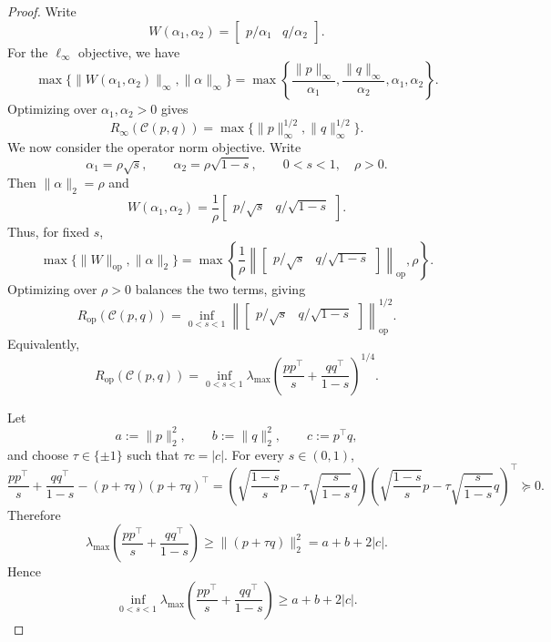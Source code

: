 \documentclass{article}
\begin{document}
\begin{proof}
Write
\[
W(\alpha_1,\alpha_2)
=
\begin{bmatrix}
p/\alpha_1 & q/\alpha_2
\end{bmatrix}.
\]
For the $\ell_\infty$ objective, we have
\[
\max\{\|W(\alpha_1,\alpha_2)\|_\infty,\|\alpha\|_\infty\}
=
\max\left\{
\frac{\|p\|_\infty}{\alpha_1},
\frac{\|q\|_\infty}{\alpha_2},
\alpha_1,
\alpha_2
\right\}.
\]
Optimizing over $\alpha_1,\alpha_2>0$ gives
\[
R_{\infty}(\mathcal{C}(p,q))
=
\max\{\|p\|_\infty^{1/2},\|q\|_\infty^{1/2}\}.
\]
We now consider the operator norm objective. Write
\[
\alpha_1=\rho\sqrt{s},
\qquad
\alpha_2=\rho\sqrt{1-s},
\qquad
0<s<1,\quad \rho>0.
\]
Then $\|\alpha\|_2=\rho$ and
\[
W(\alpha_1,\alpha_2)
=
\frac1{\rho}
\begin{bmatrix}
p/\sqrt{s} & q/\sqrt{1-s}
\end{bmatrix}.
\]
Thus, for fixed $s$,
\[
\max\{\|W\|_{\mathrm{op}},\|\alpha\|_2\}
=
\max\left\{
\frac1{\rho}
\left\|
\begin{bmatrix}
p/\sqrt{s} & q/\sqrt{1-s}
\end{bmatrix}
\right\|_{\mathrm{op}},
\rho
\right\}.
\]
Optimizing over $\rho>0$ balances the two terms, giving
\[
R_{\mathrm{op}}(\mathcal{C}(p,q))
=
\inf_{0<s<1}
\left\|
\begin{bmatrix}
p/\sqrt{s} & q/\sqrt{1-s}
\end{bmatrix}
\right\|_{\mathrm{op}}^{1/2}.
\]
Equivalently,
\[
R_{\mathrm{op}}(\mathcal{C}(p,q))
=
\inf_{0<s<1}
\lambda_{\max}\!\left(
\frac{pp^\top}{s}
+
\frac{qq^\top}{1-s}
\right)^{1/4}.
\]

Let
\[
a:=\|p\|_2^2,\qquad
b:=\|q\|_2^2,\qquad
c:=p^\top q,
\]
and choose $\tau\in\{\pm1\}$ such that $\tau c=|c|$. For every $s\in(0,1)$,
\[
\frac{pp^\top}{s}
+
\frac{qq^\top}{1-s}
-
(p+\tau q)(p+\tau q)^\top
=
\left(
\sqrt{\frac{1-s}{s}}p
-
\tau\sqrt{\frac{s}{1-s}}q
\right)
\left(
\sqrt{\frac{1-s}{s}}p
-
\tau\sqrt{\frac{s}{1-s}}q
\right)^\top
\succeq 0.
\]
Therefore
\[
\lambda_{\max}\!\left(
\frac{pp^\top}{s}
+
\frac{qq^\top}{1-s}
\right)
\ge
\|(p+\tau q)\|_2^2
=
a+b+2|c|.
\]
Hence
\[
\inf_{0<s<1}
\lambda_{\max}\!\left(
\frac{pp^\top}{s}
+
\frac{qq^\top}{1-s}
\right)
\ge
a+b+2|c|.
\]


\end{proof}
\end{document}
